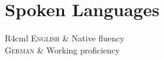 \documentclass{article} %
\begin{document}

\section{Spoken Languages}

\begin{tabular}{R{4cm}l}
    \textsc{English} & Native fluency \\
    \textsc{German} & Working proficiency \\
\end{tabular}
\end{document}
